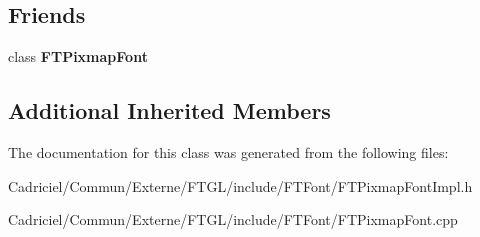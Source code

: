 \subsection*{Friends}
\begin{DoxyCompactItemize}
\item 
class {\bfseries F\+T\+Pixmap\+Font}\hypertarget{class_f_t_pixmap_font_impl_ac7f382db9ff9f02888b67b7434d7edd4}{}\label{class_f_t_pixmap_font_impl_ac7f382db9ff9f02888b67b7434d7edd4}

\end{DoxyCompactItemize}
\subsection*{Additional Inherited Members}


The documentation for this class was generated from the following files\+:\begin{DoxyCompactItemize}
\item 
Cadriciel/\+Commun/\+Externe/\+F\+T\+G\+L/include/\+F\+T\+Font/F\+T\+Pixmap\+Font\+Impl.\+h\item 
Cadriciel/\+Commun/\+Externe/\+F\+T\+G\+L/include/\+F\+T\+Font/F\+T\+Pixmap\+Font.\+cpp\end{DoxyCompactItemize}
